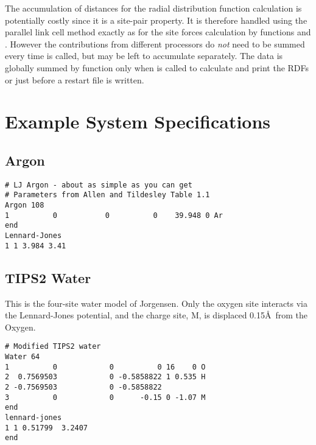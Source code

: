 \documentclass[a4paper,twoside]{report}
\begin{document}
The accumulation of distances for the radial distribution function
calculation is potentially costly since it is a site-pair property. It
is therefore handled using the parallel link cell method exactly as
for the site forces calculation by functions  and
.  However the contributions from different
processors do \emph{not} need to be summed every time
 is called, but may be left to accumulate
separately.  The data is globally summed by function
 only when  is called to
calculate and print the RDFs or just before a restart file is written.

\appendix
\chapter{Example System Specifications}  %
\label{sec:examples}
\section{Argon}%
\begin{verbatim}
# LJ Argon - about as simple as you can get
# Parameters from Allen and Tildesley Table 1.1
Argon 108
1          0           0          0    39.948 0 Ar
end
Lennard-Jones
1 1 3.984 3.41
\end{verbatim}
\section{TIPS2 Water}%
This is the four-site water model of Jorgensen\cite{jorgensen:82}.  
Only the oxygen site interacts via the Lennard-Jones
potential, and the charge site, M, is displaced 0.15{\AA}\ from the Oxygen.
\begin{verbatim}
# Modified TIPS2 water
Water 64
1          0            0          0 16    0 O
2  0.7569503            0 -0.5858822 1 0.535 H
2 -0.7569503            0 -0.5858822
3          0            0      -0.15 0 -1.07 M
end
lennard-jones
1 1 0.51799  3.2407
end
\end{verbatim}
\end{document}
